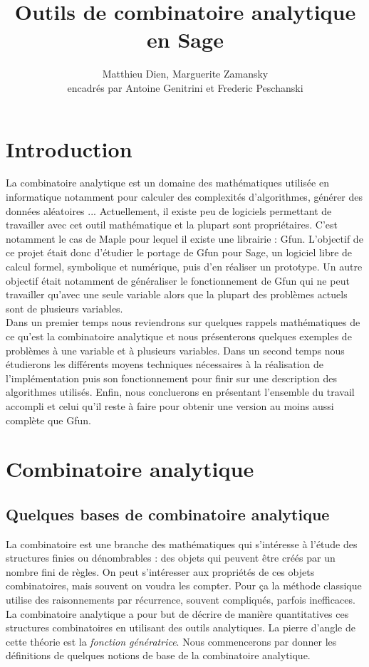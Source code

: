 \documentclass[12pt]{report}
\title{Outils de combinatoire analytique en Sage}
\author{Matthieu Dien, Marguerite Zamansky\\
encadrés par Antoine Genitrini et Frederic Peschanski }
\begin{document}
     
\maketitle
\tableofcontents
\chapter*{Introduction}
La combinatoire analytique est un domaine des mathématiques utilisée en
informatique notamment pour calculer des complexités d'algorithmes, générer des données
aléatoires ... Actuellement, il existe peu de logiciels permettant
de travailler avec cet outil mathématique et la plupart sont
propriétaires. C'est notamment le cas de Maple pour lequel il existe une
librairie : Gfun. L'objectif de ce projet était donc d'étudier le portage de
Gfun pour Sage, un logiciel libre de calcul formel, symbolique et numérique,
puis d'en réaliser un prototype.
Un autre objectif était notamment de généraliser le fonctionnement de Gfun qui
ne peut travailler qu'avec une seule variable alors que la plupart des
problèmes actuels sont de plusieurs variables.\\
Dans un premier temps nous reviendrons sur quelques rappels mathématiques de
ce qu'est la combinatoire analytique et nous présenterons quelques exemples de
problèmes à une variable et à plusieurs variables.
Dans un second temps nous étudierons les différents moyens techniques
nécessaires à la réalisation de l'implémentation puis son fonctionnement pour
finir sur une description des algorithmes utilisés.
Enfin, nous concluerons en présentant l'ensemble du travail accompli et celui
qu'il reste à faire pour obtenir une version au moins aussi complète que Gfun.

\chapter{Combinatoire analytique}

\section{Quelques bases de combinatoire analytique}
La combinatoire est une branche des mathématiques qui s'intéresse à l'étude des structures finies ou dénombrables : des objets qui peuvent être créés par un nombre fini de règles. On peut s'intéresser aux propriétés de ces objets combinatoires, mais souvent on voudra les compter. Pour ça la méthode classique utilise des raisonnements par récurrence, souvent compliqués, parfois inefficaces.
La combinatoire analytique a pour but de décrire de manière quantitatives ces structures combinatoires en utilisant des outils analytiques. La pierre d'angle de cette théorie est la \textit{fonction génératrice}. Nous commencerons par donner les définitions de quelques notions de base de la combinatoire analytique.
\end{document}
